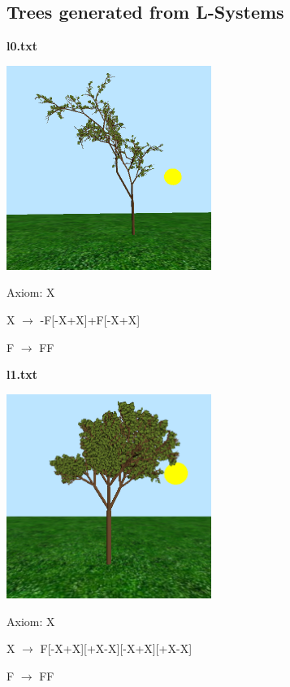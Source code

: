 \documentclass[11pt]{article} %
\begin{document}
\subsection{Trees generated from L-Systems} 

{
\centering

\textbf{l0.txt} 

\includegraphics[width=0.5\textwidth]{001}

Axiom: X

X $\rightarrow$ -F[-X+X]+F[-X+X]

F $\rightarrow$ FF

}
\newpage{}
{
\centering

\textbf{l1.txt} 

\includegraphics[width=0.5\textwidth]{002}

Axiom: X

X $\rightarrow$ F[-X+X][+X-X][-X+X][+X-X]

F $\rightarrow$ FF

}
\end{document}
